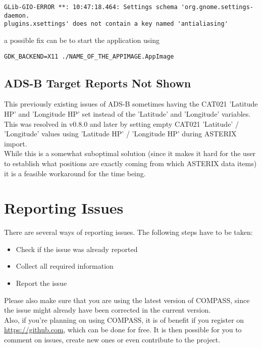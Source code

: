 \begin{verbatim}
GLib-GIO-ERROR **: 10:47:18.464: Settings schema 'org.gnome.settings-daemon.
plugins.xsettings' does not contain a key named 'antialiasing'
\end{verbatim}

a possible fix can be to start the application using 

\begin{verbatim}
GDK_BACKEND=X11 ./NAME_OF_THE_APPIMAGE.AppImage
\end{verbatim}

\subsection{ADS-B Target Reports Not Shown}

This previously existing issues of ADS-B sometimes having the CAT021 'Latitude HP' and 'Longitude HP' set instead of the 'Latitude' and 'Longitude' variables. This was resolved in v0.8.0 and later by setting empty CAT021 'Latitude' / 'Longitude' values using 'Latitude HP' / 'Longitude HP' during ASTERIX import. \\

While this is a somewhat suboptimal solution (since it makes it hard for the user to establish what positions are exactly coming from which ASTERIX data items) it is a feasible workaround for the time being.

\section{Reporting Issues}

There are several ways of reporting issues. The following steps have to be taken:

\begin{itemize}  
\item Check if the issue was already reported
\item Collect all required information
\item Report the issue
\end{itemize} 

Please also make sure that you are using the latest version of COMPASS, since the issue might already have been corrected in the current version. \\

Also, if you're planning on using COMPASS, it is of benefit if you register on \url{https://github.com}, which can be done for free. It is then possible for you to comment on issues, create new ones or even contribute to the project.

